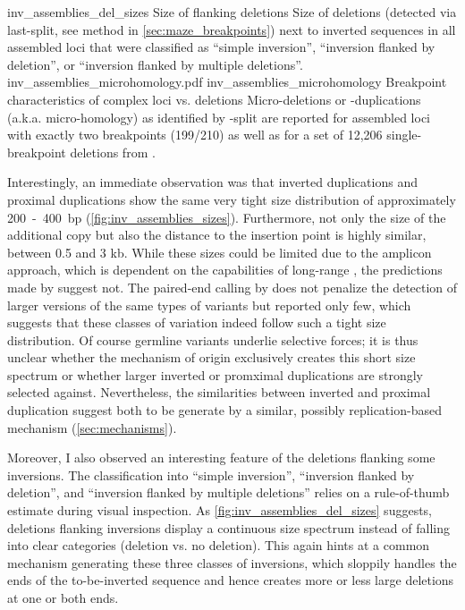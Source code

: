     {inv_assemblies_del_sizes}
    {Size of flanking deletions}
    {Size of deletions (detected via \acs{last}-split, see method in
    \cref{sec:maze_breakpoints}) next to inverted sequences in all assembled
    loci that were classified as ``simple inversion'', ``inversion flanked by
    deletion'', or ``inversion flanked by multiple deletions''.}
        {inv_assemblies_microhomology.pdf}
    {inv_assemblies_microhomology}
    {Breakpoint characteristics of complex loci vs. deletions}
    {Micro-deletions or -duplications (a.k.a. micro-homology) as identified by
    \last-split are reported for assembled loci with exactly two breakpoints
    (199/210) as well as for a set of 12,206 single-breakpoint deletions from
    \cite{Sudmant2015}.}

Interestingly, an immediate observation was that inverted duplications and
proximal duplications show the same very tight size distribution of
approximately 200~-~400~bp (\cref{fig:inv_assemblies_sizes}). Furthermore, not
only the size of the
additional copy but also the distance to the insertion point is highly similar,
between 0.5 and 3 kb. While these sizes could be limited due to the amplicon
approach, which is dependent on the capabilities of long-range \pcr, the
predictions made by \delly suggest not. The paired-end calling by \delly does
not penalize the detection of larger versions of the same types of variants but
reported only few, which suggests that these classes of variation indeed follow
such a tight size distribution. Of course germline variants underlie selective
forces; it is thus unclear whether the mechanism of origin exclusively creates
this short size spectrum or whether larger inverted or promximal duplications
are strongly selected against. Nevertheless, the similarities between inverted
and proximal duplication suggest both to be generate by a similar, possibly
replication-based mechanism (\cref{sec:mechanisms}).

Moreover, I also observed an interesting feature of the deletions flanking some
inversions. The classification into ``simple inversion'', ``inversion flanked by
deletion'', and ``inversion flanked by multiple deletions'' relies on a
rule-of-thumb estimate during visual inspection. As
\cref{fig:inv_assemblies_del_sizes} suggests, deletions flanking inversions
display a continuous size spectrum instead of falling into clear categories
(deletion vs. no deletion). This again hints at a common mechanism generating
these three classes of inversions, which sloppily handles the ends of the
to-be-inverted sequence and hence creates more or less large deletions at one
or both ends.



